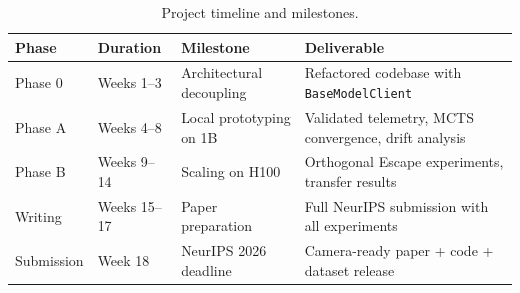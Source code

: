 \documentclass[10pt]{article}
\begin{document}
\begin{table}[h]
\centering
\begin{tabular}{@{}llll@{}}
\toprule
\textbf{Phase} & \textbf{Duration} & \textbf{Milestone} & \textbf{Deliverable} \\
\midrule
Phase 0 & Weeks 1--3 & Architectural decoupling & Refactored codebase with \texttt{BaseModelClient} \\
Phase A & Weeks 4--8 & Local prototyping on 1B & Validated telemetry, MCTS convergence, drift analysis \\
Phase B & Weeks 9--14 & Scaling on H100 & Orthogonal Escape experiments, transfer results \\
Writing & Weeks 15--17 & Paper preparation & Full NeurIPS submission with all experiments \\
Submission & Week 18 & NeurIPS 2026 deadline & Camera-ready paper + code + dataset release \\
\bottomrule
\end{tabular}
\caption{Project timeline and milestones.}
\label{tab:timeline}
\end{table}
\end{document}

